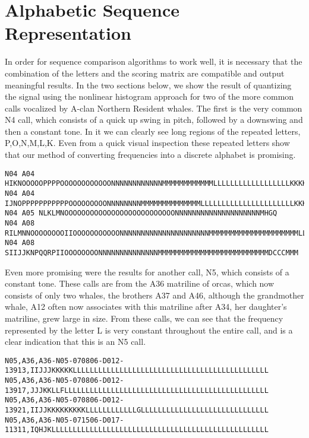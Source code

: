 \section{Alphabetic Sequence Representation}

In order for sequence comparison algorithms to work well, it is
necessary that the combination of the letters and the scoring matrix
are compatible and output meaningful results.  In the two sections
below, we show the result of quantizing the signal using the nonlinear
histogram approach for two of the more common calls vocalized by
A-clan Northern Resident whales.  The first is the very common N4
call, which consists of a quick up swing in pitch, followed by a
downswing and then a constant tone.  In it we can clearly see long
regions of the repeated letters, P,O,N,M,L,K.  Even from a quick
visual inspection these repeated letters show that our method of
converting frequencies into a discrete alphabet is promising.

{\tiny
\begin{verbatim}
N04 A04 HIKNOOOOOPPPPOOOOOOOOOOOONNNNNNNNNNNNMMMMMMMMMMMMLLLLLLLLLLLLLLLLLLKKKKKKKKKKKKKKK
N04 A04 IJNOPPPPPPPPPPPOOOOOOOOONNNNNNNNMMMMMMMMMMMMMMLLLLLLLLLLLLLLLLLLLLLLKKKKKKKKKKKKKK
N04 A05 NLKLMNOOOOOOOOOOOOOOOOOOOOOOOOOONNNNNNNNNNNNNNNNNNNNMHGQ
N04 A08 RILMNNOOOOOOOOIIOOOOOOOOOOONNNNNNNNNNNNNNNNNNNNNMMMMMMMMMMMMMMMMMMMMMLLLLLLLMLLLLL
N04 A08 SIIJJKNPQQRPIIOOOOOOOONNNNNNNNNNNNNNMMMMMMMMMMMMMMMMMMMMMMMMMMDCCCMMM
\end{verbatim}
}

Even more promising were the results for another call, N5, which
consists of a constant tone.  These calls are from the A36 matriline
of orcas, which now consists of only two whales, the brothers A37 and
A46, although the grandmother whale, A12 often now associates with
this matriline after A34, her daughter's matriline, grew large in
size.  From these calls, we can see that the frequency represented by
the letter L is very constant throughout the entire call, and is a
clear indication that this is an N5 call.

{\tiny
\begin{verbatim}
N05,A36,A36-N05-070806-D012-13913,IIJJJKKKKKLLLLLLLLLLLLLLLLLLLLLLLLLLLLLLLLLLLLLLLLLLLLLL
N05,A36,A36-N05-070806-D012-13917,JJJKKLLFLLLLLLLLLLLLLLLLLLLLLLLLLLLLLLLLLLLLLLLLLLLLLLLL
N05,A36,A36-N05-070806-D012-13921,IIJJKKKKKKKKKLLLLLLLLLLLLGLLLLLLLLLLLLLLLLLLLLLLLLLLLLLL
N05,A36,A36-N05-071506-D017-11311,IQHJKLLLLLLLLLLLLLLLLLLLLLLLLLLLLLLLLLLLLLLLLLLLLLLLLLLL
\end{verbatim}
}
